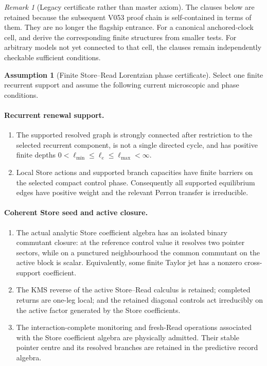 \documentclass[11pt]{article}
\theoremstyle{definition}
\newtheorem{assumption}[theorem]{Assumption}
\theoremstyle{remark}
\newtheorem{remark}[theorem]{Remark}
\begin{document}
\begin{remark}[Legacy certificate rather than master axiom]
The clauses below are retained because the subsequent V053 proof chain is
self-contained in terms of them.  They are no longer the flagship entrance.
For a canonical anchored-clock cell,  and
 derive the corresponding finite
structures from smaller tests.  For arbitrary models not yet connected to that
cell, the clauses remain independently checkable sufficient conditions.
\end{remark}

\begin{assumption}[Finite Store--Read Lorentzian phase certificate]
\label{ass:finite-phase}
Select one finite recurrent support and assume the following current
microscopic and phase conditions.

\paragraph{Recurrent renewal support.}
\begin{enumerate}[label=\textup{(P\arabic*)},leftmargin=3em]
\item The supported resolved graph is strongly connected after restriction to
      the selected recurrent component, is not a single directed cycle, and has
      positive finite depths $0<\ell_{\min}\le\ell_e\le\ell_{\max}<\infty$.
\item Local Store actions and supported branch capacities have finite barriers
      on the selected compact control phase.  Consequently all supported
      equilibrium edges have positive weight and the relevant Perron transfer
      is irreducible.
\end{enumerate}

\paragraph{Coherent Store seed and active closure.}
\begin{enumerate}[label=\textup{(P\arabic*)},leftmargin=3em,start=3]
\item The actual analytic Store coefficient algebra has an isolated binary
      commutant closure: at the reference control value it resolves two pointer
      sectors, while on a punctured neighbourhood the common commutant on the
      active block is scalar.  Equivalently, some finite Taylor jet has a
      nonzero cross-support coefficient.
\item The KMS reverse of the active Store--Read calculus is retained; completed
      returns are one-leg local; and the retained diagonal controls act
      irreducibly on the active factor generated by the Store coefficients.
\item The interaction-complete monitoring and fresh-Read operations associated
      with the Store coefficient algebra are physically admitted.  Their stable
      pointer centre and its resolved branches are retained in the predictive
      record algebra.
\end{enumerate}


\end{assumption}
\end{document}
